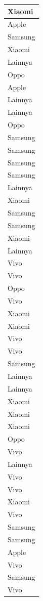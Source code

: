 \documentclass[
  letterpaper,
  DIV=11,
  numbers=noendperiod]{scrartcl}
\begin{document}
\begin{table}
\begin{tabular}[t]{l}
\hline
Xiaomi\\
\hline
Apple\\
\hline
Samsung\\
\hline
Xiaomi\\
\hline
Lainnya\\
\hline
Oppo\\
\hline
Apple\\
\hline
Lainnya\\
\hline
Lainnya\\
\hline
Oppo\\
\hline
Samsung\\
\hline
Samsung\\
\hline
Samsung\\
\hline
Samsung\\
\hline
Lainnya\\
\hline
Xiaomi\\
\hline
Samsung\\
\hline
Samsung\\
\hline
Xiaomi\\
\hline
Lainnya\\
\hline
Vivo\\
\hline
Vivo\\
\hline
Oppo\\
\hline
Vivo\\
\hline
Xiaomi\\
\hline
Xiaomi\\
\hline
Vivo\\
\hline
Vivo\\
\hline
Samsung\\
\hline
Lainnya\\
\hline
Lainnya\\
\hline
Xiaomi\\
\hline
Xiaomi\\
\hline
Xiaomi\\
\hline
Oppo\\
\hline
Vivo\\
\hline
Lainnya\\
\hline
Vivo\\
\hline
Vivo\\
\hline
Xiaomi\\
\hline
Vivo\\
\hline
Samsung\\
\hline
Samsung\\
\hline
Apple\\
\hline
Vivo\\
\hline
Samsung\\
\hline
Vivo\\

\end{tabular}
\end{table}
\end{document}
